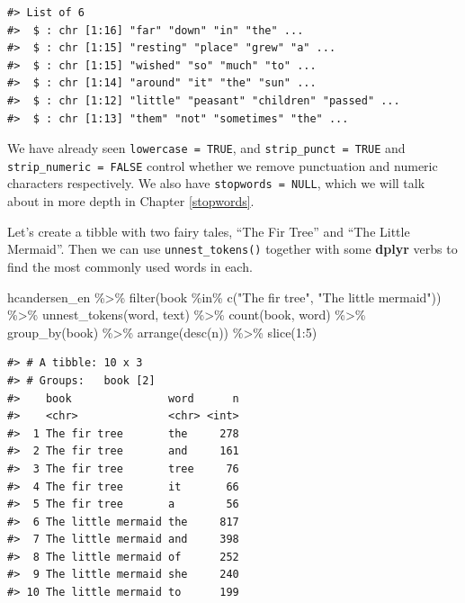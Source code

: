 \documentclass[
]{krantz}
\makeatletter
\newenvironment{Shaded}{\begin{snugshade}}{\end{snugshade}}
\newcommand{\DecValTok}[1]{\textcolor[rgb]{0.00,0.00,0.81}{#1}}
\newcommand{\FunctionTok}[1]{\textcolor[rgb]{0.00,0.00,0.00}{#1}}
\newcommand{\NormalTok}[1]{#1}
\newcommand{\SpecialCharTok}[1]{\textcolor[rgb]{0.00,0.00,0.00}{#1}}
\newcommand{\StringTok}[1]{\textcolor[rgb]{0.31,0.60,0.02}{#1}}
\newenvironment{kframe}{%
\medskip{}
\setlength{\fboxsep}{.8em}
 \def\at@end@of@kframe{}%
 \ifinner\ifhmode%
  \def\at@end@of@kframe{\end{minipage}}%
  \begin{minipage}{\columnwidth}%
 \fi\fi%
 \def\FrameCommand##1{\hskip\@totalleftmargin \hskip-\fboxsep
 \colorbox{shadecolor}{##1}\hskip-\fboxsep
     \hskip-\linewidth \hskip-\@totalleftmargin \hskip\columnwidth}%
 \MakeFramed {\advance\hsize-\width
   \@totalleftmargin\z@ \linewidth\hsize
   \@setminipage}}%
 {\par\unskip\endMakeFramed%
 \at@end@of@kframe}
\renewenvironment{Shaded}{\begin{kframe}}{\end{kframe}}
\makeatother
\begin{document}
\begin{verbatim}
#> List of 6
#>  $ : chr [1:16] "far" "down" "in" "the" ...
#>  $ : chr [1:15] "resting" "place" "grew" "a" ...
#>  $ : chr [1:15] "wished" "so" "much" "to" ...
#>  $ : chr [1:14] "around" "it" "the" "sun" ...
#>  $ : chr [1:12] "little" "peasant" "children" "passed" ...
#>  $ : chr [1:13] "them" "not" "sometimes" "the" ...
\end{verbatim}

We have already seen \texttt{lowercase\ =\ TRUE}, and \texttt{strip\_punct\ =\ TRUE} and \texttt{strip\_numeric\ =\ FALSE} control whether we remove punctuation and numeric characters respectively. We also have \texttt{stopwords\ =\ NULL}, which we will talk about in more depth in Chapter \ref{stopwords}.

Let's create a tibble with two fairy tales, ``The Fir Tree'' and ``The Little Mermaid''. Then we can use \texttt{unnest\_tokens()} together with some \textbf{dplyr} verbs to find the most commonly used words in each.

\begin{Shaded}
\begin{Highlighting}[]
\NormalTok{hcandersen\_en }\SpecialCharTok{\%\textgreater{}\%}
  \FunctionTok{filter}\NormalTok{(book }\SpecialCharTok{\%in\%} \FunctionTok{c}\NormalTok{(}\StringTok{"The fir tree"}\NormalTok{, }\StringTok{"The little mermaid"}\NormalTok{)) }\SpecialCharTok{\%\textgreater{}\%}
  \FunctionTok{unnest\_tokens}\NormalTok{(word, text) }\SpecialCharTok{\%\textgreater{}\%}
  \FunctionTok{count}\NormalTok{(book, word) }\SpecialCharTok{\%\textgreater{}\%}
  \FunctionTok{group\_by}\NormalTok{(book) }\SpecialCharTok{\%\textgreater{}\%}
  \FunctionTok{arrange}\NormalTok{(}\FunctionTok{desc}\NormalTok{(n)) }\SpecialCharTok{\%\textgreater{}\%}
  \FunctionTok{slice}\NormalTok{(}\DecValTok{1}\SpecialCharTok{:}\DecValTok{5}\NormalTok{)}
\end{Highlighting}
\end{Shaded}

\begin{verbatim}
#> # A tibble: 10 x 3
#> # Groups:   book [2]
#>    book               word      n
#>    <chr>              <chr> <int>
#>  1 The fir tree       the     278
#>  2 The fir tree       and     161
#>  3 The fir tree       tree     76
#>  4 The fir tree       it       66
#>  5 The fir tree       a        56
#>  6 The little mermaid the     817
#>  7 The little mermaid and     398
#>  8 The little mermaid of      252
#>  9 The little mermaid she     240
#> 10 The little mermaid to      199
\end{verbatim}
\end{document}
